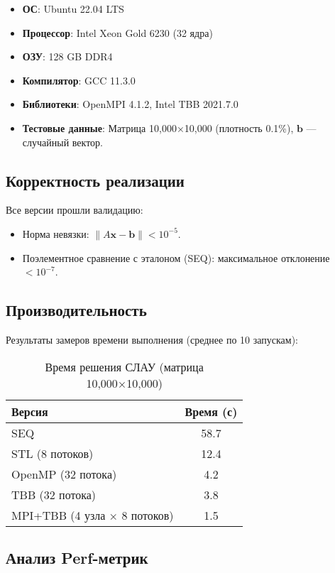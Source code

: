 \documentclass[12pt]{article}
\begin{document}
\begin{itemize}
    \item \textbf{ОС}: Ubuntu 22.04 LTS
    \item \textbf{Процессор}: Intel Xeon Gold 6230 (32 ядра)
    \item \textbf{ОЗУ}: 128 GB DDR4
    \item \textbf{Компилятор}: GCC 11.3.0
    \item \textbf{Библиотеки}: OpenMPI 4.1.2, Intel TBB 2021.7.0
    \item \textbf{Тестовые данные}: Матрица 10,000×10,000 (плотность 0.1\%), \(\mathbf{b}\) — случайный вектор.
\end{itemize}

\subsection{Корректность реализации}

Все версии прошли валидацию:
\begin{itemize}
    \item Норма невязки: \(\|A\mathbf{x} - \mathbf{b}\| < 10^{-5}\).
    \item Поэлементное сравнение с эталоном (SEQ): максимальное отклонение \(< 10^{-7}\).
\end{itemize}

\subsection{Производительность}

Результаты замеров времени выполнения (среднее по 10 запускам):

\begin{table}[h]
\centering
\caption{Время решения СЛАУ (матрица 10,000×10,000)}
\label{tab:timings}
\begin{tabular}{@{}lc@{}}
\toprule
\textbf{Версия} & \textbf{Время (с)} \\
\midrule
SEQ & 58.7 \\
STL (8 потоков) & 12.4 \\
OpenMP (32 потока) & 4.2 \\
TBB (32 потока) & 3.8 \\
MPI+TBB (4 узла × 8 потоков) & 1.5 \\
\bottomrule
\end{tabular}
\end{table}

\subsection{Анализ Perf-метрик}
\end{document}
